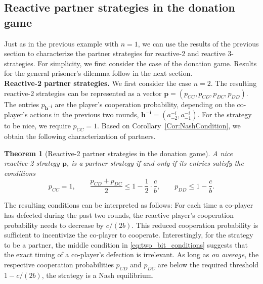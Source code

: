 \documentclass[11pt]{article}
\theoremstyle{plainCl1}
\newtheorem{theorem}{Theorem}
\theoremstyle{plainCl2}
\begin{document}

\subsection{Reactive partner strategies in the donation game}\label{section:reactive_strategies}

Just as in the previous example with $n\!=\!1$, we can use the results of the previous section to characterize the partner strategies for reactive-2 and reactive 3-strategies. 
For simplicity, we first consider the case of the donation game. Results for the general prisoner's dilemma follow in the next section.\\ 

\noindent
{\bf Reactive-2 partner strategies.}
We first consider the case $n\!=\!2$. 
The resulting reactive-2 strategies can be represented as a vector
$\mathbf{p}=(p_{CC}, p_{CD}, p_{DC}, p_{DD})$. 
The entries $p_\mathbf{h^{-i}}$ are the player's cooperation probability, depending on the co-player's actions in the previous two rounds, $\mathbf{h^{-i}}\!=\!(a^{-i}_{-2},a^{-i}_{-1})$. 
For the strategy to be nice, we require $p_{CC}\!=\!1$. 
Based on Corollary~\ref{Cor:NashCondition}, we obtain the following characterization of partners. 

\begin{theorem}[Reactive-2 partner strategies in the donation game]\label{theorem:reactive_two_partner_strategies}
A nice reactive-2 strategy $\mathbf{p}$, is a partner strategy if and only if its entries satisfy the conditions
\begin{equation}\label{eq:two_bit_conditions}
  p_{CC} \!=\! 1, \qquad \displaystyle \frac{p_{CD} \!+\! p_{DC}}{2} \!\le\! 1 \!-\! \frac{1}{2} \cdot \frac{c}{b}, \qquad p_{DD} \le 1\!-\! \frac{c}{b}.
\end{equation}
\end{theorem}

\noindent
The resulting conditions can be interpreted as follows: For each time a co-player has defected during the past two rounds, the reactive player's cooperation probability needs to decrease by $c/(2b)$. 
This reduced cooperation probability is sufficient to incentivize the co-player to cooperate. 
Interestingly, for the strategy to be a partner, the middle condition in \eqref{eq:two_bit_conditions} suggests that the exact timing of a co-player's defection is irrelevant. 
As long as {\it on average}, the respective cooperation probabilities $p_{CD}$ and $p_{DC}$ are below the required threshold $1\!-\!c/(2b)$, the strategy is a Nash equilibrium. 
\end{document}
